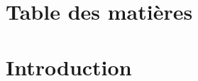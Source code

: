 \documentclass[a4paper, 12pt]{report}
\begin{document}
\section*{Table des matières}
\section*{Introduction}




\end{document}
